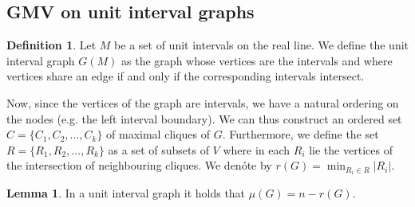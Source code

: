 \documentclass[a4paper, 12pt]{article}
\theoremstyle{plain}
\theoremstyle{definition}
\newtheorem{definition}[theorem]{Definition} %
\theoremstyle{lemma}
\newtheorem{lemma}[theorem]{Lemma}
\theoremstyle{remark}
\theoremstyle{corollary}
\theoremstyle{example}
\begin{document}
	\subsection{GMV on unit interval graphs}
	\begin{definition}
		Let $M$ be a set of unit intervals on the real line. We define the unit interval graph $G(M)$ as the graph whose vertices are the intervals and where vertices share an edge if and only if the corresponding intervals intersect. 
	\end{definition}
	Now, since the vertices of the graph are intervals, we have a natural ordering on the nodes (e.g. the left interval boundary). We can thus construct an ordered set $C = \{C_1,C_2,...,C_k\}$ of maximal cliques of $G$. Furthermore, we define the set $R = \{R_1,R_2,...,R_k\}$ as a set of subsets of $V$ where in each $R_i$ lie the vertices of the intersection of neighbouring cliques. We denóte by $r(G) = \min_{R_i \in R} \left|R_i\right|$.
	\begin{lemma}
		In a unit interval graph it holds that $\mu(G) = n - r(G)$.
	\end{lemma}
\end{document}
